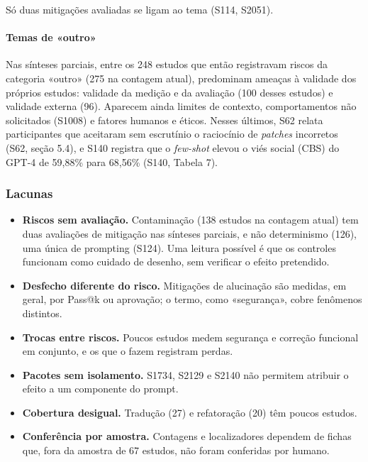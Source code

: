 Só duas mitigações avaliadas se ligam ao tema (S114, S2051).

\paragraph{Temas de «outro»}
Nas sínteses parciais, entre os 248 estudos que então registravam riscos da categoria «outro» (275 na contagem
atual), predominam ameaças à validade dos próprios estudos: validade da medição e da avaliação (100 desses
estudos) e validade externa (96). Aparecem ainda limites de contexto, comportamentos não solicitados (S1008) e fatores humanos e éticos.
Nesses últimos, S62 relata participantes que aceitaram sem escrutínio o raciocínio de \textit{patches} incorretos (S62, seção 5.4), e S140 registra que o \textit{few-shot} elevou o viés social (CBS) do GPT-4 de 59,88\% para 68,56\% (S140, Tabela 7).

\subsubsection{Lacunas}

\begin{itemize}
\item \textbf{Riscos sem avaliação.} Contaminação (138 estudos na contagem atual) tem duas avaliações de mitigação nas
sínteses parciais, e não determinismo (126), uma única de prompting (S124). Uma leitura possível é que os controles funcionam como cuidado de desenho, sem verificar o efeito pretendido.
\item \textbf{Desfecho diferente do risco.} Mitigações de alucinação são medidas, em geral, por Pass@k ou aprovação; o termo, como «segurança», cobre fenômenos distintos.
\item \textbf{Trocas entre riscos.} Poucos estudos medem segurança e correção funcional em conjunto, e os que o fazem registram perdas.
\item \textbf{Pacotes sem isolamento.} S1734, S2129 e S2140 não permitem atribuir o efeito a um componente do prompt.
\item \textbf{Cobertura desigual.} Tradução (27) e refatoração (20) têm poucos estudos.
\item \textbf{Conferência por amostra.} Contagens e localizadores dependem de fichas que, fora da amostra de 67 estudos, não foram conferidas por humano.
\end{itemize}
